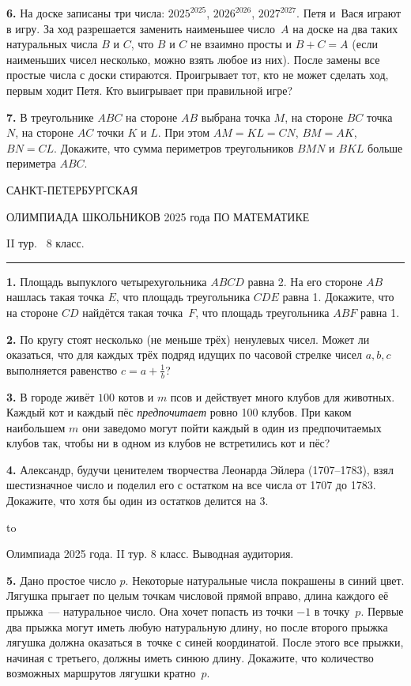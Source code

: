 \documentclass[12pt]{article}
\def\q#1.{{\bf #1. }}
\def\dotline{\smallskip\hbox to \hsize{\dotfill}\medskip}
\begin{document}
\q6. На доске записаны три числа: $2025^{2025}$, $2026^{2026}$, $2027^{2027}$. Петя и~Вася играют в игру. За ход разрешается заменить наименьшее число~$A$ на доске на два таких натуральных числа $B$ и $C$, что $B$ и $C$ не взаимно просты и $B + C = A$ (если наименьших чисел несколько, можно взять любое из них). После замены все простые числа с доски стираются. Проигрывает тот, кто не может сделать ход, первым ходит Петя. Кто выигрывает при правильной игре?

\q7. В треугольнике $ABC$ на стороне $AB$ выбрана точка $M$, на стороне $BC$ точка $N$, на стороне $AC$ точки $K$ и $L$. При этом $AM=KL=CN$, $BM=AK$, $BN=CL$. Докажите, что сумма периметров треугольников $BMN$ и $BKL$ больше периметра $ABC$.


\clearpage

\centerline{\sc САНКТ-ПЕТЕРБУРГСКАЯ}
\centerline{\sc ОЛИМПИАДА ШКОЛЬНИКОВ 2025 года ПО МАТЕМАТИКЕ}
\centerline{\sc II тур. \ 8 класс.}
\medskip
\hrule
\bigskip

\q1. Площадь выпуклого четырехугольника $ABCD$ равна 2. На его стороне $AB$ нашлась такая точка $E$, что площадь треугольника $CDE$ равна 1. Докажите, что на стороне $CD$ найдётся такая точка~$F$, что площадь треугольника $ABF$ равна 1.

\q2. По кругу стоят несколько (не меньше трёх) ненулевых чисел. Может ли оказаться, что для каждых трёх подряд идущих по часовой стрелке чисел $a, b, c$ выполняется равенство $c=a+\frac 1b$?

\q3. В городе живёт $100$ котов и $m$ псов и действует много клубов для животных. Каждый кот и каждый пёс \emph{предпочитает} ровно 100 клубов. При каком наибольшем $m$ они заведомо могут пойти каждый в один из
предпочитаемых клубов так, чтобы ни в одном из клубов не встретились кот и пёс? 

\q4. Александр, будучи ценителем творчества Леонарда Эйлера (1707--1783), взял шестизначное число и поделил его с остатком на все числа от 1707 до 1783. Докажите, что хотя бы один из остатков делится на 3.

\dotline

\centerline{Олимпиада 2025 года. II тур. 8 класс. Выводная аудитория.}
\smallskip

\q5. Дано простое число $p$. Некоторые натуральные числа покрашены в синий цвет. Лягушка прыгает по целым точкам числовой прямой вправо, длина каждого её прыжка~--- натуральное число. Она хочет попасть из точки $-1$ в точку~$p$. Первые два прыжка могут иметь любую натуральную длину, но после второго прыжка лягушка должна оказаться в~точке с синей координатой. После этого все прыжки, начиная с третьего, должны иметь синюю длину. Докажите, что количество возможных маршрутов лягушки кратно~$p$.
\end{document}
